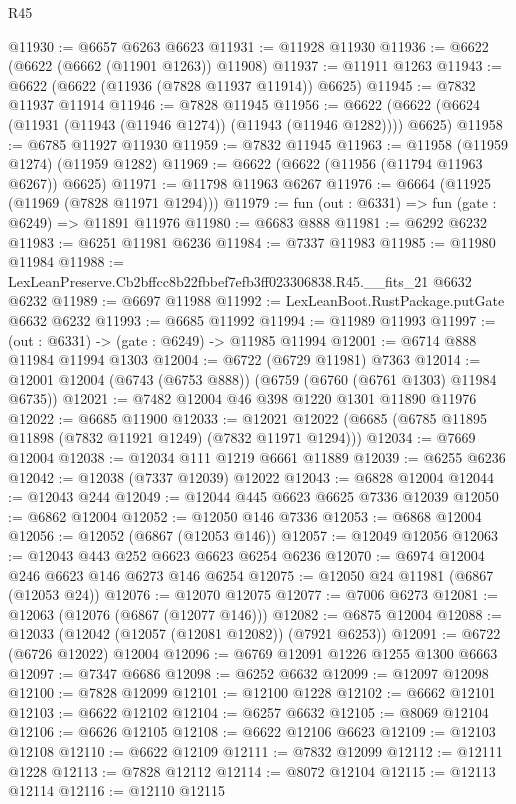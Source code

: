 \begin{lexlean}{R45}
\begin{coremodule}
{@11930 := @6657 @6263 @6623
@11931 := @11928 @11930
@11936 := @6622 (@6622 (@6662 (@11901 @1263)) @11908)
@11937 := @11911 @1263
@11943 := @6622 (@6622 (@11936 (@7828 @11937 @11914)) @6625)
@11945 := @7832 @11937 @11914
@11946 := @7828 @11945
@11956 := @6622 (@6622 (@6624 (@11931 (@11943 (@11946 @1274)) (@11943 (@11946 @1282)))) @6625)
@11958 := @6785 @11927 @11930
@11959 := @7832 @11945
@11963 := @11958 (@11959 @1274) (@11959 @1282)
@11969 := @6622 (@6622 (@11956 (@11794 @11963 @6267)) @6625)
@11971 := @11798 @11963 @6267
@11976 := @6664 (@11925 (@11969 (@7828 @11971 @1294)))
@11979 := fun (out : @6331) => fun (gate : @6249) => @11891 @11976
@11980 := @6683 @888
@11981 := @6292 @6232
@11983 := @6251 @11981 @6236
@11984 := @7337 @11983
@11985 := @11980 @11984
@11988 := LexLeanPreserve.Cb2bffcc8b22fbbef7efb3ff023306838.R45.__fits_21 @6632 @6232
@11989 := @6697 @11988
@11992 := LexLeanBoot.RustPackage.putGate @6632 @6232
@11993 := @6685 @11992
@11994 := @11989 @11993
@11997 := (out : @6331) -> (gate : @6249) -> @11985 @11994
@12001 := @6714 @888 @11984 @11994 @1303
@12004 := @6722 (@6729 @11981) @7363
@12014 := @12001 @12004 (@6743 (@6753 @888)) (@6759 (@6760 (@6761 @1303) @11984 @6735))
@12021 := @7482 @12004 @46 @398 @1220 @1301 @11890 @11976
@12022 := @6685 @11900
@12033 := @12021 @12022 (@6685 (@6785 @11895 @11898 (@7832 @11921 @1249) (@7832 @11971 @1294)))
@12034 := @7669 @12004
@12038 := @12034 @111 @1219 @6661 @11889
@12039 := @6255 @6236
@12042 := @12038 (@7337 @12039) @12022
@12043 := @6828 @12004
@12044 := @12043 @244
@12049 := @12044 @445 @6623 @6625 @7336 @12039
@12050 := @6862 @12004
@12052 := @12050 @146 @7336
@12053 := @6868 @12004
@12056 := @12052 (@6867 (@12053 @146))
@12057 := @12049 @12056
@12063 := @12043 @443 @252 @6623 @6623 @6254 @6236
@12070 := @6974 @12004 @246 @6623 @146 @6273 @146 @6254
@12075 := @12050 @24 @11981 (@6867 (@12053 @24))
@12076 := @12070 @12075
@12077 := @7006 @6273
@12081 := @12063 (@12076 (@6867 (@12077 @146)))
@12082 := @6875 @12004
@12088 := @12033 (@12042 (@12057 (@12081 @12082)) (@7921 @6253))
@12091 := @6722 (@6726 @12022) @12004
@12096 := @6769 @12091 @1226 @1255 @1300 @6663
@12097 := @7347 @6686
@12098 := @6252 @6632
@12099 := @12097 @12098
@12100 := @7828 @12099
@12101 := @12100 @1228
@12102 := @6662 @12101
@12103 := @6622 @12102
@12104 := @6257 @6632
@12105 := @8069 @12104
@12106 := @6626 @12105
@12108 := @6622 @12106 @6623
@12109 := @12103 @12108
@12110 := @6622 @12109
@12111 := @7832 @12099
@12112 := @12111 @1228
@12113 := @7828 @12112
@12114 := @8072 @12104
@12115 := @12113 @12114
@12116 := @12110 @12115
}
\end{coremodule}
\end{lexlean}
